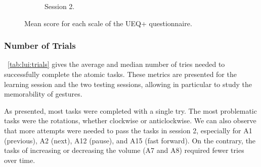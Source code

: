\begin{figure}[!b]
\begin{subfigure}{.495\linewidth}
        \caption{Session 2.}
        \label{fig:lui:ueqplus-scales:session2}
    \end{subfigure}
    \vspace{-16pt}
    \caption{Mean score for each scale of the UEQ+ questionnaire.}
    \label{fig:lui:ueqplus-scales}
\end{figure}

\subsubsection{Number of Trials}

\tab~\ref{tab:lui:trials} gives the average and median number of tries needed to successfully complete the atomic tasks. These metrics are presented for the learning session and the two testing sessions, allowing in particular to study the memorability of gestures.

As presented, most tasks were completed with a single try. The most problematic tasks were the rotations, whether clockwise or anticlockwise. We can also observe that more attempts were needed to pass the tasks in session 2, especially for A1 (previous), A2 (next), A12 (pause), and A15 (fast forward). On the contrary, the tasks of increasing or decreasing the volume (A7 and A8) required fewer tries over time.

